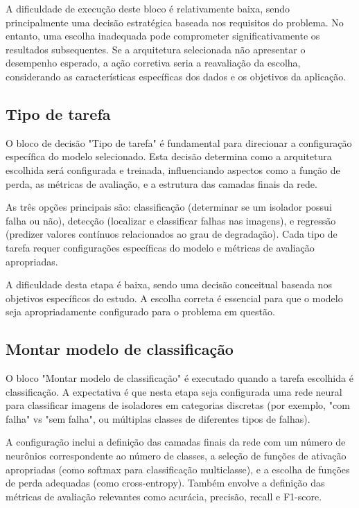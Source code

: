 A dificuldade de execução deste bloco é relativamente baixa, sendo principalmente uma decisão estratégica baseada nos requisitos do problema. No entanto, uma escolha inadequada pode comprometer significativamente os resultados subsequentes. Se a arquitetura selecionada não apresentar o desempenho esperado, a ação corretiva seria a reavaliação da escolha, considerando as características específicas dos dados e os objetivos da aplicação.

\subsection{Tipo de tarefa}
O bloco de decisão "Tipo de tarefa" é fundamental para direcionar a configuração específica do modelo selecionado. Esta decisão determina como a arquitetura escolhida será configurada e treinada, influenciando aspectos como a função de perda, as métricas de avaliação, e a estrutura das camadas finais da rede.

As três opções principais são: classificação (determinar se um isolador possui falha ou não), detecção (localizar e classificar falhas nas imagens), e regressão (predizer valores contínuos relacionados ao grau de degradação). Cada tipo de tarefa requer configurações específicas do modelo e métricas de avaliação apropriadas.

A dificuldade desta etapa é baixa, sendo uma decisão conceitual baseada nos objetivos específicos do estudo. A escolha correta é essencial para que o modelo seja apropriadamente configurado para o problema em questão.

\subsection{Montar modelo de classificação}
O bloco "Montar modelo de classificação" é executado quando a tarefa escolhida é classificação. A expectativa é que nesta etapa seja configurada uma rede neural para classificar imagens de isoladores em categorias discretas (por exemplo, "com falha" vs "sem falha", ou múltiplas classes de diferentes tipos de falhas).

A configuração inclui a definição das camadas finais da rede com um número de neurônios correspondente ao número de classes, a seleção de funções de ativação apropriadas (como softmax para classificação multiclasse), e a escolha de funções de perda adequadas (como cross-entropy). Também envolve a definição das métricas de avaliação relevantes como acurácia, precisão, recall e F1-score.

